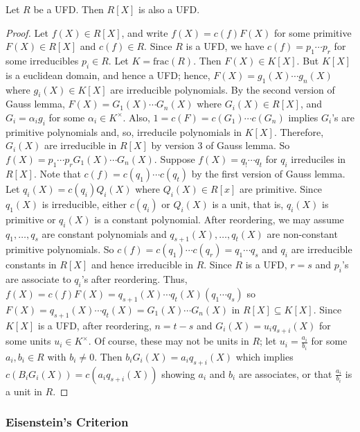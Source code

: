 \begin{theorem}
    Let $R$ be a UFD. Then $R[X]$ is also a UFD.
\end{theorem}
\begin{proof}
    Let $f(X) \in R[X]$, and write $f(X) = c(f) F(X)$ for some primitive $F(X) \in R[X]$ and $c(f) \in R$. Since $R$ is a UFD, we have $c(f) = p_{1} \cdots p_{r}$ for some irreducibles $p_{i} \in R$. Let $K = \mathrm{frac}(R)$. Then $F(X) \in K[X]$. But $K[X]$ is a euclidean domain, and hence a UFD; hence, $F(X) = g_{1}(X) \cdots g_{n}(X)$ where $g_{i}(X) \in K[X]$ are irreducible polynomials. By the second version of Gauss lemma, $F(X) = G_{1}(X) \cdots G_{n}(X)$ where $G_{i}(X) \in R[X]$, and $G_{i} = \alpha_{i} g_{i}$ for some $\alpha_{i} \in K^{\times}$. Also, $1 = c(F) = c(G_{1}) \cdots c(G_{n})$ implies $G_{i}$'s are primitive polynomials and, so, irreducile polynomials in $K[X]$. Therefore, $G_{i}(X)$ are irreducible in $R[X]$ by version 3 of Gauss lemma. So $f(X) = p_{1} \cdots p_{r} G_{1}(X) \cdots G_{n}(X)$. Suppose $f(X) = q_{!} \cdots q_{t}$ for $q_{i}$ irreduciles in $R[X]$. Note that $c(f) = c(q_{1}) \cdots c(q_{t})$ by the first version of Gauss lemma. Let $q_{i}(X) = c(q_{i}) Q_{i}(X)$ where $Q_{i}(X) \in R[x]$ are primitive. Since $q_{1}(X)$ is irreducible, either $c(q_{i})$ or $Q_{i}(X)$ is a unit, that is, $q_{i}(X)$ is primitive or $q_{i}(X)$ is a constant polynomial. After reordering, we may assume $q_{1},\ldots,q_{s}$ are constant polynomials and $q_{s+1}(X),\ldots,q_{t}(X)$ are non-constant primitive polynomials. So $c(f) = c(q_{1}) \cdots c(q_{r}) = q_{1} \cdots q_{s}$ and $q_{i}$ are irreducible constants in $R[X]$ and hence irreducible in $R$. Since $R$ is a UFD, $r = s$ and $p_{i}$'s are associate to $q_{i}$'s after reordering. Thus, $f(X) = c(f) F(X) = q_{s+1}(X) \cdots q_{t}(X) (q_{1} \cdots q_{s})$ so $F(X) = q_{s+1}(X) \cdots q_{t}(X) = G_{1}(X) \cdots G_{n}(X)$ in $R[X] \subseteq K[X]$. Since $K[X]$ is a UFD, after reordering, $n = t-s$ and $G_{i}(X) = u_{i} q_{s+i}(X)$ for some units $u_{i} \in K^{\times}$. Of course, these may not be units in $R$; let $u_{i} = \frac{a_{i}}{b_{i}}$ for some $a_{i},b_{i} \in R$ with $b_{i} \neq 0$. Then $b_{i}G_{i}(X) = a_{i}q_{s+i}(X)$ which implies $c(B_{i} G_{i}(X)) = c(a_{i} q_{s+i}(X))$ showing $a_{i}$ and $b_{i}$ are associates, or that $\frac{a_{i}}{b_{i}}$ is a unit in $R$.
\end{proof}

\subsubsection{Eisenstein's Criterion}


